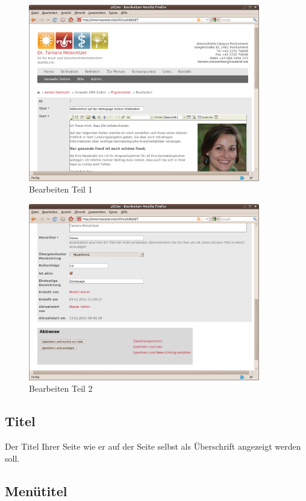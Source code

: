 \documentclass[article, a4paper, oneside, 11pt]{memoir}
\begin{document}
\begin{figure}[htp]
\centering
\includegraphics[width=0.9\textwidth]{edit1}
\caption{Bearbeiten Teil 1}
\label{fig:edit1}
\end{figure}

\begin{figure}[htp]
\centering
\includegraphics[width=0.9\textwidth]{edit2}
\caption{Bearbeiten Teil 2}
\label{fig:edit2}
\end{figure}

\subsection{Titel}

Der Titel Ihrer Seite wie er auf der Seite selbst als Überschrift angezeigt werden soll.

\subsection{Menütitel}
\end{document}
